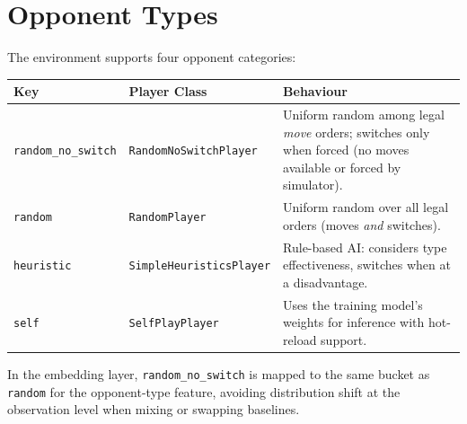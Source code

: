 
\section{Opponent Types}

The environment supports four opponent categories:

\begin{center}
\small
\begin{tabularx}{\textwidth}{l l X}
  \toprule
  \textbf{Key} & \textbf{Player Class} & \textbf{Behaviour} \\
  \midrule
  \texttt{random\_no\_switch} & \texttt{RandomNoSwitchPlayer} &
    Uniform random among legal \emph{move} orders; switches only when forced
    (no moves available or forced by simulator). \\
  \texttt{random} & \texttt{RandomPlayer} &
    Uniform random over all legal orders (moves \emph{and} switches). \\
  \texttt{heuristic} & \texttt{SimpleHeuristicsPlayer} &
    Rule-based AI: considers type effectiveness, switches when at a
    disadvantage. \\
  \texttt{self} & \texttt{SelfPlayPlayer} &
    Uses the training model's weights for inference with hot-reload support. \\
  \bottomrule
\end{tabularx}
\end{center}

In the embedding layer, \texttt{random\_no\_switch} is mapped to the same
bucket as \texttt{random} for the opponent-type feature, avoiding distribution
shift at the observation level when mixing or swapping baselines.
